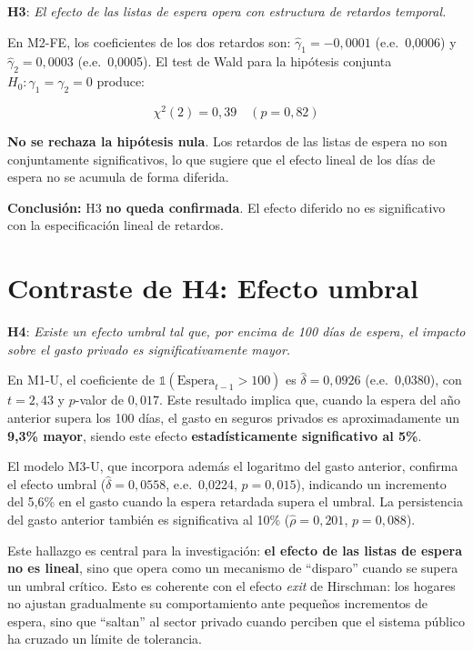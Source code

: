 \textbf{H3}: \textit{El efecto de las listas de espera opera con estructura de
retardos temporal.}

En M2-FE, los coeficientes de los dos retardos son: $\hat{\gamma}_1 = -0{,}0001$
(e.e.\ 0{,}0006) y $\hat{\gamma}_2 = 0{,}0003$ (e.e.\ 0{,}0005). El test de
Wald para la hipótesis conjunta $H_0: \gamma_1 = \gamma_2 = 0$ produce:

\begin{equation}
  \chi^2(2) = 0{,}39 \quad (p = 0{,}82)
  \label{eq:wald_lags}
\end{equation}

\textbf{No se rechaza la hipótesis nula}. Los retardos de las listas de espera
no son conjuntamente significativos, lo que sugiere que el efecto lineal de los
días de espera no se acumula de forma diferida.

\textbf{Conclusión:} H3 \textbf{no queda confirmada}. El efecto diferido no es
significativo con la especificación lineal de retardos.

\section{Contraste de H4: Efecto umbral}
\label{sec:h4}

\textbf{H4}: \textit{Existe un efecto umbral tal que, por encima de 100 días de
espera, el impacto sobre el gasto privado es significativamente mayor.}

En M1-U, el coeficiente de $\mathbb{1}(\text{Espera}_{t-1}>100)$ es
$\hat{\delta} = 0{,}0926$ (e.e.\ 0{,}0380), con $t = 2{,}43$ y $p$-valor de
$0{,}017$. Este resultado implica que, cuando la espera del año anterior supera
los 100 días, el gasto en seguros privados es aproximadamente un
\textbf{9{,}3\% mayor}, siendo este efecto \textbf{estadísticamente
significativo al 5\%}.

El modelo M3-U, que incorpora además el logaritmo del gasto anterior, confirma
el efecto umbral ($\hat{\delta} = 0{,}0558$, e.e.\ 0{,}0224, $p = 0{,}015$),
indicando un incremento del 5{,}6\% en el gasto cuando la espera retardada
supera el umbral. La persistencia del gasto anterior también es significativa
al 10\% ($\hat{\rho} = 0{,}201$, $p = 0{,}088$).

Este hallazgo es central para la investigación: \textbf{el efecto de las listas
de espera no es lineal}, sino que opera como un mecanismo de ``disparo'' cuando
se supera un umbral crítico. Esto es coherente con el efecto \textit{exit} de
Hirschman: los hogares no ajustan gradualmente su comportamiento ante pequeños
incrementos de espera, sino que ``saltan'' al sector privado cuando perciben
que el sistema público ha cruzado un límite de tolerancia.

